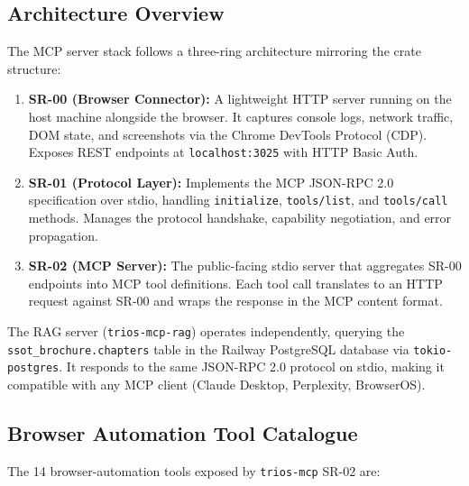 \subsection{Architecture Overview}\label{fa_23:subsec:mcp-arch}

The MCP server stack follows a three-ring architecture mirroring the crate structure:

\begin{enumerate}
\item \textbf{SR-00 (Browser Connector):} A lightweight HTTP server running on the host machine alongside the browser. It captures console logs, network traffic, DOM state, and screenshots via the Chrome DevTools Protocol (CDP). Exposes REST endpoints at \texttt{localhost:3025} with HTTP Basic Auth.

\item \textbf{SR-01 (Protocol Layer):} Implements the MCP JSON-RPC 2.0 specification over stdio, handling \texttt{initialize}, \texttt{tools/list}, and \texttt{tools/call} methods. Manages the protocol handshake, capability negotiation, and error propagation.

\item \textbf{SR-02 (MCP Server):} The public-facing stdio server that aggregates SR-00 endpoints into MCP tool definitions. Each tool call translates to an HTTP request against SR-00 and wraps the response in the MCP content format.
\end{enumerate}

The RAG server (\texttt{trios-mcp-rag}) operates independently, querying the \texttt{ssot\_brochure.chapters} table in the Railway PostgreSQL database via \texttt{tokio-postgres}. It responds to the same JSON-RPC 2.0 protocol on stdio, making it compatible with any MCP client (Claude Desktop, Perplexity, BrowserOS).

\subsection{Browser Automation Tool Catalogue}\label{fa_23:subsec:tool-catalogue}

The 14 browser-automation tools exposed by \texttt{trios-mcp} SR-02 are:

